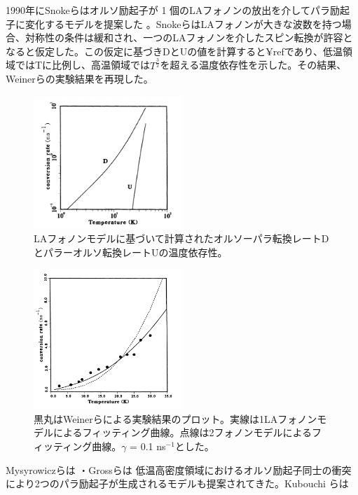 1990年にSnokeらはオルソ励起子が 1 個のLAフォノンの放出を介してパラ励起子に変化するモデルを提案した \cite{snoke1990}。SnokeらはLAフォノンが大きな波数を持つ場合、対称性の条件は緩和され、一つのLAフォノンを介したスピン転換が許容となると仮定した。この仮定に基づきDとUの値を計算すると¥refであり、低温領域ではTに比例し、高温領域では$T^{\frac{3}{2}}$を超える温度依存性を示した。その結果、Weinerらの実験結果を再現した。
\begin{figure}[htbp]
\centering
\includegraphics[width=0.5\textwidth]{Screenshoot_2024-08-16_23.59.31.png}
\caption{LAフォノンモデルに基づいて計算されたオルソーパラ転換レートDとパラーオルソ転換レートUの温度依存性。}
\label{fig:exciton_phonon_sideband2}
\end{figure}
\begin{figure}[htbp]
\centering
\includegraphics[width=0.5\textwidth]{Screenshoot_2024-08-17_0.01.54.png}
\caption{黒丸はWeinerらによる実験結果のプロット。実線は1LAフォノンモデルによるフィッティング曲線。点線は2フォノンモデルによるフィッティング曲線。$\gamma$ = 0.1 ns$^{-1}$とした。}
\label{fig:exciton_phonon_sideband2}
\end{figure}


Mysyrowiczらは
・Grossらは
低温高密度領域におけるオルソ励起子同士の衝突により2つのパラ励起子が生成されるモデルも提案されてきた。Kubouchi らは

